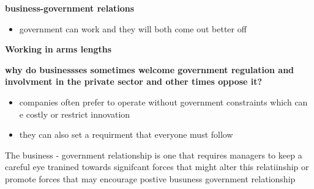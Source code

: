 \documentclass{article}
\begin{document}
\textbf{\huge business-government relations  }

\begin{itemize}
\item government can work and they will both come out better off 

\end{itemize}

\textbf{\huge Working in arms lengths  }

\textbf{ why do businessses sometimes welcome government regulation and involvment in the private sector and other times oppose it?}

\begin{itemize}
\item companies often prefer to operate without government constraints which can e costly or restrict innovation 
\item they can also set a requirment that everyone must follow 

\end{itemize} 
The business - government relationship is one that requires  managers to keep a careful eye tranined towards signifcant forces that might alter this relatiinship or promote forces that may encourage postive busuness government relationship 
\end{document}
